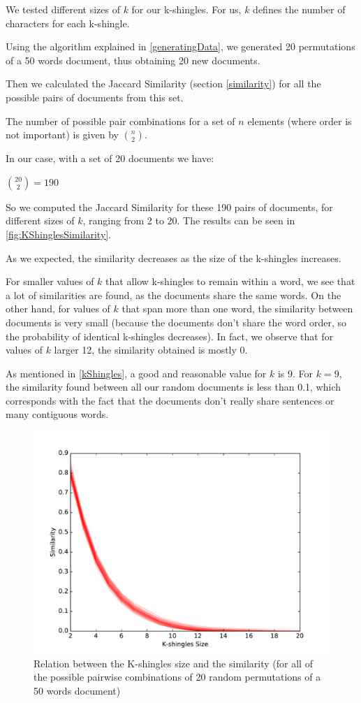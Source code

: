 \documentclass[12pt]{article}
\begin{document}
We tested different sizes of $k$ for our k-shingles.
For us, $k$ defines the number of characters for each k-shingle.

Using the algorithm explained in \autoref{generatingData}, we generated 20 permutations of a 50 words document, thus obtaining 20 new documents.

Then we calculated the Jaccard Similarity (section \autoref{similarity}) for all the possible pairs of documents from this set.

The number of possible pair combinations for a set of $n$ elements (where order is not important) is given by $\binom{n}{2}$.

In our case, with a set of 20 documents we have:
\bigbreak
\centerline{\large $\binom{20}{2} = 190$}
\bigbreak

So we computed the Jaccard Similarity for these 190 pairs of documents, for different sizes of $k$, ranging from 2 to 20. The results can be seen in \autoref{fig:KShinglesSimilarity}.

\bigbreak
As we expected, the similarity decreases as the size of the k-shingles increases.

For smaller values of $k$ that allow k-shingles to remain within a word, we see that a lot of similarities are found, as the documents share the same words.
On the other hand, for values of $k$ that span more than one word, the similarity between documents is very small (because the documents don't share the word order, so the probability of identical k-shingles decreases).
In fact, we observe that for values of $k$ larger 12, the similarity obtained is mostly 0.

As mentioned in \autoref{kShingles}, a good and reasonable value for $k$ is 9.
For $k = 9$, the similarity found between all our random documents is less than 0.1, which corresponds with the fact that the documents don't really share sentences or many contiguous words.

\begin{figure}[H]
	\centering
	\includegraphics[scale=0.5]{graphs/JaccardSimilarityValueKshingles.pdf} 
	\caption{Relation between the K-shingles size and the similarity (for all of the possible pairwise combinations of 20 random permutations of a 50 words document)}
	\label{fig:KShinglesSimilarity}
\end{figure}
\end{document}
